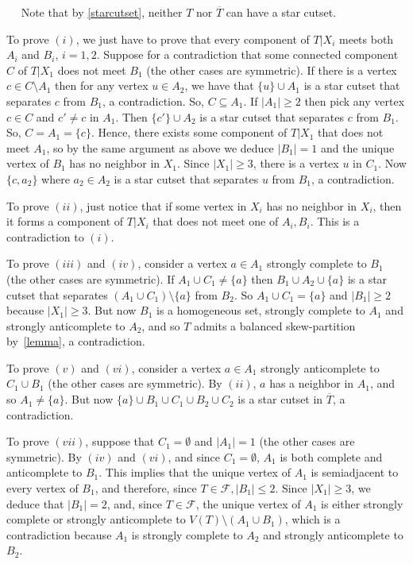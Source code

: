 \documentclass[11 pt] {article}
\newcounter{claim}
\newcommand{\Proof}{\setcounter{claim}{0}\noindent{\bf Proof.}\ \ }
\begin{document}
\Proof 
Note that by \ref{starcutset}, neither $T$ nor $\overline{T}$ can have
a star cutset.  

To prove $(i)$, we just have to prove that every component of $T|X_i$
meets both $A_i$ and $B_i$, $i=1,2$. Suppose for a contradiction that
some connected component $C$ of $T|X_1$ does not meet $B_1$ (the other
cases are symmetric). If there is a vertex $c\in C\setminus A_1$ then
for any vertex $u\in A_2$, we have that $\{u\}\cup A_1$ is a star
cutset that separates $c$ from $B_1$, a contradiction.  So,
$C\subseteq A_1$. If $|A_1|\geq 2$ then pick any vertex $c\in C$ and
$c'\not= c$ in $A_1$. Then $\{c'\}\cup A_2$ is a star cutset that
separates $c$ from $B_1$. So, $C=A_1=\{c\}$. Hence, there exists some
component of $T|X_1$ that does not meet $A_1$, so by the same argument
as above we deduce $|B_1|=1$ and the unique vertex of $B_1$ has no
neighbor in $X_1$. Since $|X_1|\geq 3$, there is a vertex $u$ in
$C_1$. Now $\{c ,a_2\}$ where $a_2\in A_2$ is a star cutset that
separates $u$ from $B_1$, a contradiction.


To prove $(ii)$, just notice that if some vertex in $X_i$ has no
neighbor in $X_i$, then it forms a component of $T|X_i$ that does not
meet one of $A_i, B_i$. This is a contradiction to $(i)$.

To prove $(iii)$ and $(iv)$, consider a vertex $a\in A_1$ strongly
complete to $B_1$ (the other cases are symmetric). If $A_1\cup
C_1\not= \{a\}$ then $B_1\cup A_2\cup\{a\}$ is a star cutset that
separates $(A_1\cup C_1)\setminus \{a\}$ from $B_2$. So $A_1\cup
C_1=\{a\}$ and $|B_1|\geq 2$ because $|X_1|\geq 3$.  But now $B_1$ is
a homogeneous set, strongly complete to $A_1$ and strongly
anticomplete to $A_2$, and so $T$ admits a balanced skew-partition
by~\ref{lemma}, a contradiction.

To prove $(v)$ and $(vi)$, consider a vertex $a\in A_1$ strongly
anticomplete to $C_1\cup B_1$ (the other cases are symmetric). By
$(ii)$, $a$ has a neighbor in $A_1$, and so $A_1\not = \{a\}$. But now
$\{a\}\cup B_1\cup C_1\cup B_2\cup C_2$ is a star cutset in
$\overline{T}$, a contradiction.

To prove $(vii)$, suppose that $C_1=\emptyset$ and $|A_1|=1$ (the
other cases are symmetric). By $(iv)$ and $(vi)$, and since
$C_1=\emptyset$, $A_1$ is both complete and anticomplete to
$B_1$. This implies that the unique vertex of $A_1$ is semiadjacent
to every vertex of $B_1$, and therefore, since $T\in\mathcal{F},
|B_1|\leq 2$. Since $|X_1|\geq 3$, we deduce that $|B_1|=2$, and,
since $T\in \mathcal{F}$, the unique vertex of $A_1$ is either
strongly complete or strongly anticomplete to $V(T)\setminus(A_1\cup
B_1)$, which is a contradiction because $A_1$ is strongly complete to
$A_2$ and strongly anticomplete to $B_2$.
\end{document}
